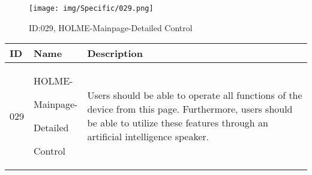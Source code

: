 \documentclass[conference]{IEEEtran}
\begin{document}
\begin{enumerate}
\begin{figure}[h]
\centering
\texttt{[image: img/Specific/029.png]}
\caption{ID:029, HOLME-Mainpage-Detailed Control}
\end{figure}
\begin{table}[h]
\def\arraystretch{1.2} \small
    \begin{tabular}{|p{1cm}|p{1.8cm}|p{5.0cm}|}
        \hline
        ID & Name & Description\\ \hline
         029 \par  & HOLME-\par Mainpage-\par Detailed \par Control &
         Users should be able to operate all functions of the device from this page.
         Furthermore, users should be able to utilize these features through an artificial intelligence speaker.\\ \hline
    \end{tabular}
\end{table}
\clearpage


\end{enumerate}
\end{document}
